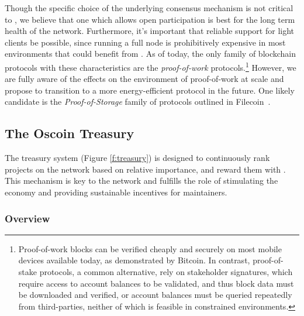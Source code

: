 Though the specific choice of the underlying consensus mechanism is not
critical to \oscoin{}, we believe that one which allows open
participation is best for the long term health of the network. Furthermore,
it's important that reliable support for light clients be possible, since
running a full node is prohibitively expensive in most environments that could
benefit from \oscoin{}. As of today, the only family of blockchain protocols with these
characteristics are the \emph{proof-of-work} protocols.\footnote{Proof-of-work blocks
can be verified cheaply and securely on most mobile devices available
today, as demonstrated by Bitcoin. In contrast, proof-of-stake protocols,
a common alternative, rely on stakeholder signatures, which require access to
account balances to be validated, and thus block data must be downloaded and
verified, or account balances must be queried repeatedly from third-parties,
neither of which is feasible in constrained environments.} However, we are
fully aware of the effects on the environment of proof-of-work at
scale and propose to transition to a more energy-efficient protocol in the future.
One likely candidate is the \emph{Proof-of-Storage} family of protocols outlined
in Filecoin~\cite{filecoin}.

\begin{figure*}[!ht]
    \par\medskip\noindent\minipage{\linewidth}
    \centering
    
    \caption{The \Oscoin{} Treasury System\label{f:treasury}}
    \endminipage\par\medskip
\end{figure*}

\subsection{The Oscoin Treasury}
\label{s:treasury}

The treasury system (Figure \ref{f:treasury}) is designed to continuously
rank projects on the network based on relative importance, and reward them with
\oscoin{}. This mechanism is key to the network and fulfills the
role of stimulating the economy and providing sustainable incentives for
maintainers.

\subsubsection{Overview}

